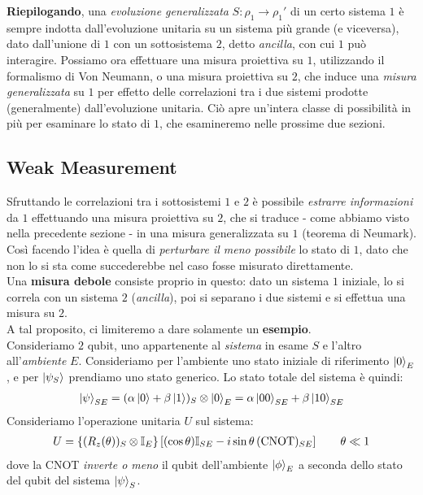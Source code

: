\documentclass[../../InformazioneQuantistica.tex]{subfiles}
\begin{document}
\textbf{Riepilogando}, una \textit{evoluzione generalizzata} $S: \rho_1 \to \rho_1'$ di un certo sistema $1$ è sempre indotta dall'evoluzione unitaria su un sistema più grande (e viceversa), dato dall'unione di $1$ con un sottosistema $2$, detto \textit{ancilla}, con cui $1$ può interagire. Possiamo ora effettuare una misura proiettiva su $1$, utilizzando il formalismo di Von Neumann, o una misura proiettiva su $2$, che induce una \textit{misura generalizzata} su $1$ per effetto delle correlazioni tra i due sistemi prodotte (generalmente) dall'evoluzione unitaria. Ciò apre un'intera classe di possibilità in più per esaminare lo stato di $1$, che esamineremo nelle prossime due sezioni.

\subsection{Weak Measurement}
Sfruttando le correlazioni tra i sottosistemi $1$ e $2$ è possibile \textit{estrarre informazioni} da $1$ effettuando una misura proiettiva su $2$, che si traduce - come abbiamo visto nella precedente sezione - in una misura generalizzata su $1$ (teorema di Neumark). Così facendo l'idea è quella di \textit{perturbare il meno possibile} lo stato di $1$, dato che non lo si sta  come succederebbe nel caso fosse misurato direttamente.\\
Una \textbf{misura debole} consiste proprio in questo: dato un sistema $1$ iniziale, lo si correla con un sistema $2$ (\textit{ancilla}), poi si separano i due sistemi e si effettua una misura su $2$.\\
A tal proposito, ci limiteremo a dare solamente un \textbf{esempio}. \\

Consideriamo $2$ qubit, uno appartenente al \textit{sistema} in esame $S$ e l'altro all'\textit{ambiente} $E$. Consideriamo per l'ambiente uno stato iniziale di riferimento $\Ket{0}_E$, e per $\Ket{\psi_S}$ prendiamo uno stato generico. Lo stato totale del sistema è quindi:
\begin{align}
\Ket{\psi}_{SE}=(\alpha \Ket{0}+\beta \Ket{1})_S \otimes \Ket{0}_E = \alpha \Ket{00}_{SE} + \beta \Ket{10}_{SE}
\label{eqn:psi-SE-0}
\end{align}
Consideriamo l'operazione unitaria $U$ sul sistema:
\begin{align*}
U=\left\{ (R_z(\theta))_S\otimes \mathbb{I}_E \right\} \left[(\cos\theta) \mathbb{I}_{SE} - i\sin\theta\,(\operatorname{CNOT})_{SE} \right] \qquad \theta \ll 1
\end{align*}
dove la CNOT \textit{inverte o meno} il qubit dell'ambiente $\Ket{\phi}_E$ a seconda dello stato del qubit del sistema $\Ket{\psi}_S$.
\end{document}
